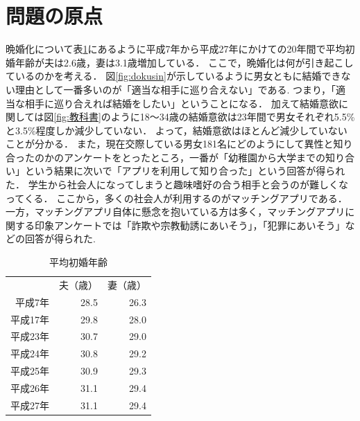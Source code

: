 \documentclass[12pt]{ltjsarticle}
\begin{document}
\section{問題の原点}
晩婚化について表\ref{table:shokon}にあるように平成7年から平成27年にかけての20年間で平均初婚年齢が夫は2.6歳，妻は3.1歳増加している．
ここで，晩婚化は何が引き起こしているのかを考える．
図\ref{fig:dokusin}が示しているように男女ともに結婚できない理由として一番多いのが「適当な相手に巡り合えない」である\cite{doukou}.
つまり，「適当な相手に巡り合えれば結婚をしたい」ということになる．
加えて結婚意欲に関しては図\ref{fig:教科書}のように18～34歳の結婚意欲は23年間で男女それぞれ5.5\%と3.5\%程度しか減少していない．
よって，結婚意欲はほとんど減少していないことが分かる．
また，現在交際している男女181名にどのようにして異性と知り合ったのかのアンケートをとったところ，一番が「幼稚園から大学までの知り合い」という結果に次いで「アプリを利用して知り合った」という回答が得られた\cite{cancan}．
学生から社会人になってしまうと趣味嗜好の合う相手と会うのが難しくなってくる．
ここから，多くの社会人が利用するのがマッチングアプリである．
一方，マッチングアプリ自体に懸念を抱いている方は多く，マッチングアプリに関する印象アンケートでは「詐欺や宗教勧誘にあいそう」，「犯罪にあいそう」などの回答が得られた\cite{prtimes}.
\begin{table}
\centering
  \caption{平均初婚年齢}
  \label{table:shokon}
  \begin{tabular}{rrr}
   & 夫（歳） & 妻（歳） \\
  平成7年 & 28.5 & 26.3 \\
  平成17年 & 29.8 & 28.0 \\
  平成23年 & 30.7 & 29.0 \\
  平成24年 & 30.8 & 29.2 \\
  平成25年 & 30.9 & 29.3 \\
  平成26年 & 31.1 & 29.4 \\
  平成27年 & 31.1 & 29.4 \\
  \end{tabular}
  \end{table}
\end{document}

